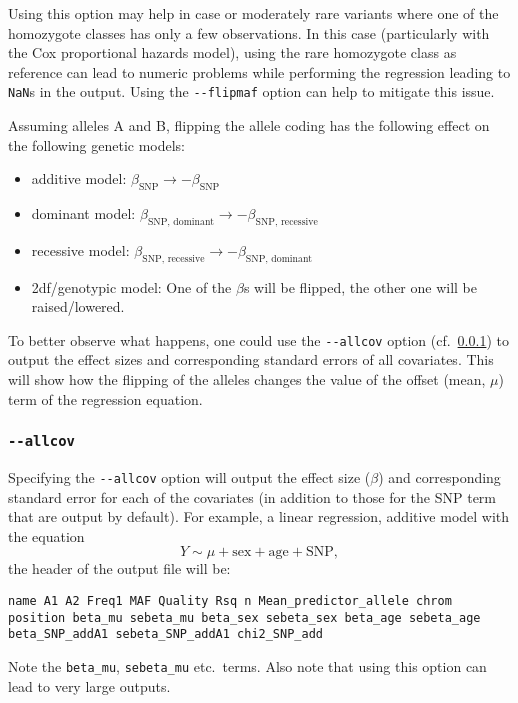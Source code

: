 \documentclass[12pt,a4paper]{article}
\begin{document}
Using this option may help in case or moderately rare variants where
one of the homozygote classes has only a few observations. In this
case (particularly with the Cox proportional hazards model), using the
rare homozygote class as reference can lead to numeric problems while
performing the regression leading to \lstinline{NaN}s in the output.
Using the \lstinline{--flipmaf} option can help to mitigate this
issue.

Assuming alleles A and B, flipping the allele coding has the following
effect on the following genetic models:
\begin{itemize}
\item{additive model:} $\beta_\text{SNP} \to -\beta_\text{SNP}$
\item{dominant model:}
  $\beta_\text{SNP, dominant} \to -\beta_\text{SNP, recessive}$
\item{recessive model:} $\beta_\text{SNP, recessive} \to -\beta_\text{SNP,
    dominant}$
\item{2df/genotypic model:} One of the $\beta$s will be flipped, the
  other one will be raised/lowered.
\end{itemize}
To better observe what happens, one could use the \lstinline{--allcov}
option (cf.~\ref{sec:allcov}) to output the effect sizes and
corresponding standard errors of all covariates. This will show how
the flipping of the alleles changes the value of the offset (mean,
$\mu$) term of the regression equation.

\subsubsection{\lstinline{--allcov}}
\label{sec:allcov}
Specifying the \lstinline{--allcov} option will output the effect size
($\beta$) and corresponding standard error for each of the covariates
(in addition to those for the SNP term that are output by default).
For example, a linear regression, additive model with the equation
\[
Y \sim \mu + \text{sex} + \text{age} + \text{SNP},
\]
the header of the output file will be:
\begin{lstlisting}[basicstyle=\scriptsize\ttfamily]
name A1 A2 Freq1 MAF Quality Rsq n Mean_predictor_allele chrom position beta_mu sebeta_mu beta_sex sebeta_sex beta_age sebeta_age beta_SNP_addA1 sebeta_SNP_addA1 chi2_SNP_add
\end{lstlisting}
Note the \lstinline{beta_mu}, \lstinline{sebeta_mu} etc.~terms. Also
note that using this option can lead to very large outputs.
\end{document}
